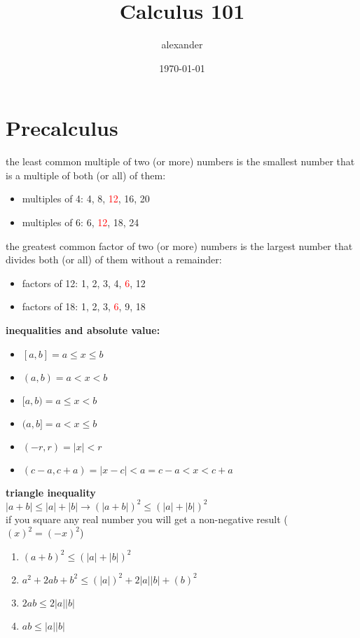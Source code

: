 \documentclass{article}
\title{Calculus 101}
\author{alexander}
\date{\today}
\begin{document}
\maketitle

\section*{Precalculus}

the least common multiple of two (or more) numbers is the smallest number that is a multiple of both (or all) of them:
	\begin{itemize}
		\item multiples of 4: 4, 8, \textcolor{red}{12}, 16, 20
		\item multiples of 6: 6, \textcolor{red}{12}, 18, 24
	\end{itemize}

the greatest common factor of two (or more) numbers is the largest number that divides both (or all) of them without a remainder:
	\begin{itemize}
		\item factors of 12: 1, 2, 3, 4, \textcolor{red}{6}, 12
		\item factors of 18: 1, 2, 3, \textcolor{red}{6}, 9, 18
	\end{itemize}

\textbf{inequalities and absolute value:}
	\begin{itemize}	
		\item $[a, b] = a \leq x \leq b$
		\item $(a, b) = a < x < b$
		\item $[a, b) = a \leq x < b$
		\item $(a, b] = a < x \leq b$
		\item $(-r, r) = \lvert x\rvert < r$
		\item $(c - a, c + a) = \lvert x - c\rvert < a = c - a < x < c + a$
	\end{itemize}

\textbf{triangle inequality}\\

$\lvert a + b\rvert \leq \lvert a \rvert + \lvert b\rvert \to (\lvert a + b\rvert)^2 \leq (\lvert a \rvert + \lvert b\rvert)^2$\\

if you square any real number you will get a non-negative result ($(x)^2 = (-x)^2$)
	\begin{enumerate}
		\item $(a + b)^2 \leq (\lvert a\rvert + \lvert b\rvert)^2$
		\item $a^2 + 2ab + b^2 \leq (\lvert a\rvert)^2 + 2\lvert a\rvert\lvert b\rvert + (b)^2$
		\item $2ab \leq 2\lvert a\rvert\lvert b \rvert$
		\item $ab \leq \lvert a\rvert\lvert b\rvert$
	\end{enumerate}
\end{document}
